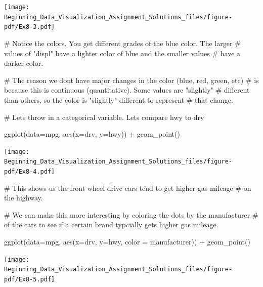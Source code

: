 \documentclass[
  letterpaper,
  DIV=11,
  numbers=noendperiod]{scrreprt}
\newenvironment{Shaded}{\begin{snugshade}}{\end{snugshade}}
\newcommand{\AttributeTok}[1]{\textcolor[rgb]{0.40,0.45,0.13}{#1}}
\newcommand{\CommentTok}[1]{\textcolor[rgb]{0.37,0.37,0.37}{#1}}
\newcommand{\FunctionTok}[1]{\textcolor[rgb]{0.28,0.35,0.67}{#1}}
\newcommand{\NormalTok}[1]{\textcolor[rgb]{0.00,0.23,0.31}{#1}}
\newcommand{\SpecialCharTok}[1]{\textcolor[rgb]{0.37,0.37,0.37}{#1}}
\begin{document}
\texttt{[image: Beginning\_Data\_Visualization\_Assignment\_Solutions\_files/figure-pdf/Ex8-3.pdf]}

\begin{Shaded}
\begin{Highlighting}[]
\CommentTok{\# Notice the colors. You get different grades of the blue color. The larger}
\CommentTok{\# values of "displ" have a lighter color of blue and the smaller values }
\CommentTok{\# have a darker color. }

\CommentTok{\# The reason we don\textquotesingle{}t have major changes in the color (blue, red, green, etc)}
\CommentTok{\# is because this is continuous (quantitative). Some values are "slightly" }
\CommentTok{\# different than others, so the color is "slightly" different to represent }
\CommentTok{\# that change.}

\CommentTok{\# Let\textquotesingle{}s throw in a categorical variable. Let\textquotesingle{}s compare hwy to drv}

\FunctionTok{ggplot}\NormalTok{(}\AttributeTok{data=}\NormalTok{mpg, }\FunctionTok{aes}\NormalTok{(}\AttributeTok{x=}\NormalTok{drv, }\AttributeTok{y=}\NormalTok{hwy)) }\SpecialCharTok{+}
  \FunctionTok{geom\_point}\NormalTok{()}
\end{Highlighting}
\end{Shaded}

\texttt{[image: Beginning\_Data\_Visualization\_Assignment\_Solutions\_files/figure-pdf/Ex8-4.pdf]}

\begin{Shaded}
\begin{Highlighting}[]
\CommentTok{\# This shows us the front wheel drive cars tend to get higher gas mileage}
\CommentTok{\# on the highway. }

\CommentTok{\# We can make this more interesting by coloring the dots by the manufacturer}
\CommentTok{\# of the cars to see if a certain brand typcially gets higher gas mileage.}

\FunctionTok{ggplot}\NormalTok{(}\AttributeTok{data=}\NormalTok{mpg, }\FunctionTok{aes}\NormalTok{(}\AttributeTok{x=}\NormalTok{drv, }\AttributeTok{y=}\NormalTok{hwy, }\AttributeTok{color =}\NormalTok{ manufacturer)) }\SpecialCharTok{+}
  \FunctionTok{geom\_point}\NormalTok{()}
\end{Highlighting}
\end{Shaded}

\texttt{[image: Beginning\_Data\_Visualization\_Assignment\_Solutions\_files/figure-pdf/Ex8-5.pdf]}
\end{document}
